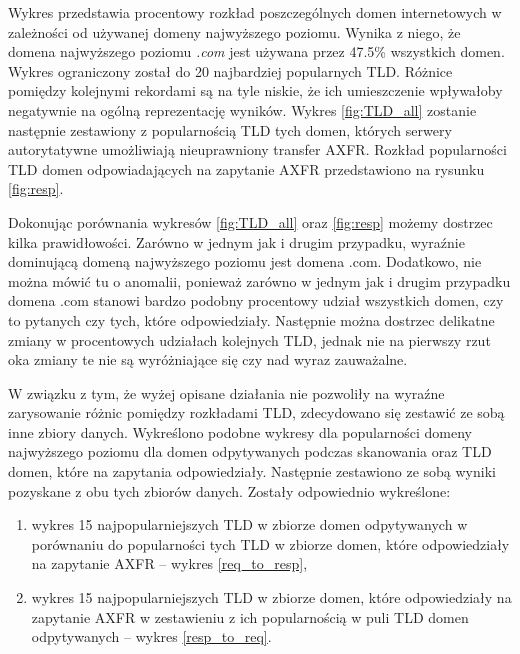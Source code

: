 Wykres przedstawia procentowy rozkład poszczególnych domen internetowych w zależności od używanej domeny najwyższego poziomu.
Wynika z niego, że domena najwyższego poziomu \textit{.com} jest używana przez 47.5\% wszystkich domen. Wykres ograniczony został
do 20 najbardziej popularnych TLD. Różnice pomiędzy kolejnymi rekordami są na tyle niskie, że ich umieszczenie wpływałoby negatywnie
na ogólną reprezentację wyników. Wykres \ref{fig:TLD_all} zostanie następnie zestawiony z popularnością TLD tych domen, których serwery
autorytatywne umożliwiają nieuprawniony transfer AXFR. Rozkład popularności TLD domen odpowiadających na zapytanie AXFR przedstawiono
na rysunku \ref{fig:resp}.

Dokonując porównania wykresów \ref{fig:TLD_all} oraz \ref{fig:resp} możemy dostrzec kilka prawidłowości. Zarówno w jednym jak i
drugim przypadku, wyraźnie dominującą domeną najwyższego poziomu jest domena .com. Dodatkowo, nie można mówić tu o anomalii,
ponieważ zarówno w jednym jak i drugim przypadku domena .com stanowi bardzo podobny procentowy udział wszystkich domen, czy to
pytanych czy tych, które odpowiedziały. Następnie można dostrzec delikatne zmiany w procentowych udziałach kolejnych TLD, jednak
nie na pierwszy rzut oka zmiany te nie są wyróżniające się czy nad wyraz zauważalne.

W związku z tym, że wyżej opisane działania nie pozwoliły na wyraźne zarysowanie różnic pomiędzy rozkładami TLD, zdecydowano się
zestawić ze sobą inne zbiory danych. Wykreślono podobne wykresy dla popularności domeny najwyższego poziomu dla domen odpytywanych
podczas skanowania oraz TLD domen, które na zapytania odpowiedziały. Następnie zestawiono ze sobą wyniki pozyskane z obu tych zbiorów
danych. Zostały odpowiednio wykreślone:
\begin{enumerate}
	\item wykres 15 najpopularniejszych TLD w zbiorze domen odpytywanych w porównaniu do popularności tych TLD w zbiorze domen,
	które odpowiedziały na zapytanie AXFR -- wykres \ref{req_to_resp},
	\item wykres 15 najpopularniejszych TLD w zbiorze domen, które odpowiedziały na zapytanie AXFR w zestawieniu z ich popularnością
	w puli TLD domen odpytywanych -- wykres \ref{resp_to_req}.
\end{enumerate}

